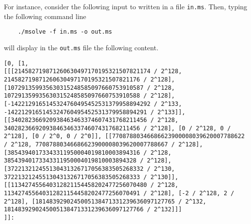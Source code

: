 \documentclass[a4paper,english,11pt]{scrartcl}
\theoremstyle{definition}
\theoremstyle{remark}
\begin{document}
For instance, consider the following input to \msolve written in a file
\verb+in.ms+.
Then, typing the following command line
\begin{tcolorbox}
  \begin{verbatim}
    ./msolve -f in.ms -o out.ms 
  \end{verbatim}
\end{tcolorbox}
will display in the \verb+out.ms+ file the following content. 
\begin{tcolorbox}
  \begin{lstlisting}
[0, [1,
[[[214582719871260630497170195321507821174 / 2^128, 214582719871260630497170195321507821176 / 2^128], [107291359935630315248585097660753910587 / 2^128, 107291359935630315248585097660753910588 / 2^128], [-1422129165145324760495452531379958894292 / 2^133, -1422129165145324760495452531379958894291 / 2^133]], [[340282366920938463463374607431768211456 / 2^128, 340282366920938463463374607431768211456 / 2^128], [0 / 2^128, 0 / 2^128], [0 / 2^0, 0 / 2^0]], [[77087880346686623900008039620007788622 / 2^128, 77087880346686623900008039620007788667 / 2^128], [38543940173343311950004019810003894316 / 2^128, 38543940173343311950004019810003894328 / 2^128], [372213212455130431326717056383505268332 / 2^130, 372213212455130431326717056383505268333 / 2^130]], [[113427455640312821154458202477256070480 / 2^128, 113427455640312821154458202477256070491 / 2^128], [-2 / 2^128, 2 / 2^128], [1814839290245005138471331239636097127765 / 2^132, 1814839290245005138471331239636097127766 / 2^132]]]
]]:
  \end{lstlisting}
\end{tcolorbox}
\end{document}
